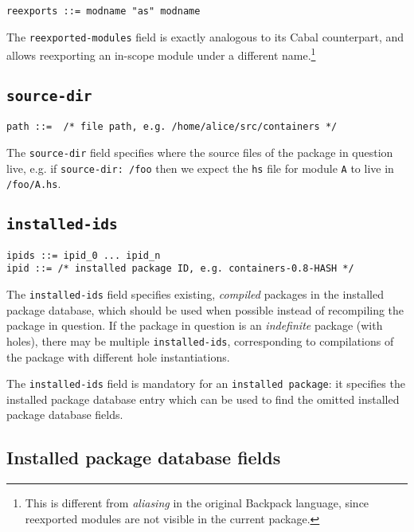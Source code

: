 \documentclass{article}
\begin{document}
\begin{verbatim}
reexports ::= modname "as" modname
\end{verbatim}

The \texttt{reexported-modules} field is exactly analogous to its Cabal
counterpart, and allows reexporting an in-scope module under a different name.\footnote{This is different from \emph{aliasing} in the original Backpack language, since reexported modules are not visible in the current package.}

\subsection{\texttt{source-dir}}

\begin{verbatim}
path ::=  /* file path, e.g. /home/alice/src/containers */
\end{verbatim}

The \texttt{source-dir} field specifies where the source files of
the package in question live, e.g. if \texttt{source-dir: /foo}
then we expect the \texttt{hs} file for module \texttt{A} to live
in \texttt{/foo/A.hs}.

\subsection{\texttt{installed-ids}}

\begin{verbatim}
ipids ::= ipid_0 ... ipid_n
ipid ::= /* installed package ID, e.g. containers-0.8-HASH */
\end{verbatim}

The \texttt{installed-ids} field specifies existing, \emph{compiled} packages in
the installed package database, which should be used when possible
instead of recompiling the package in question.  If the package in
question is an \emph{indefinite} package (with holes), there may be
multiple \texttt{installed-ids}, corresponding to compilations of the package
with different hole instantiations.

The \texttt{installed-ids} field is mandatory for an \texttt{installed package}:
it specifies the installed package database entry which can be used
to find the omitted installed package database fields.

\subsection{Installed package database fields}
\end{document}
